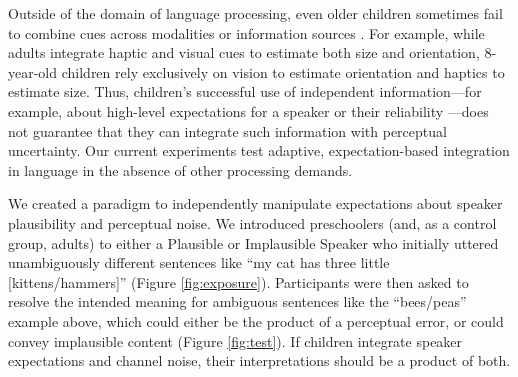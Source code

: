 \documentclass[man,floatsintext]{apa6}
\begin{document}
Outside of the domain of language processing, even older children sometimes fail to combine cues across modalities or information sources \cite{gori2008,nardini2008,nardini2010}. For example, while adults integrate haptic and visual cues to estimate both size and orientation, 8-year-old children rely exclusively on vision to estimate orientation and haptics to estimate size. Thus, children's successful use of independent information---for example, about high-level expectations for a speaker \cite{graham2014,matthews2010} or their reliability \cite{pasquini2007}---does not guarantee that they can integrate such information with perceptual uncertainty. Our current experiments test adaptive, expectation-based integration in language in the absence of other processing demands.


We created a paradigm to independently manipulate expectations about speaker plausibility and perceptual noise. We introduced preschoolers (and, as a control group, adults) to either a Plausible or Implausible Speaker who initially uttered unambiguously different sentences like ``my cat has three little [kittens/hammers]'' (Figure \ref{fig:exposure}). Participants were then asked to resolve the intended meaning for ambiguous sentences like the ``bees/peas'' example above, which could either be the product of a perceptual error, or could convey implausible content (Figure \ref{fig:test}). If children integrate speaker expectations and channel noise, their interpretations should be a product of both.

\end{document}
